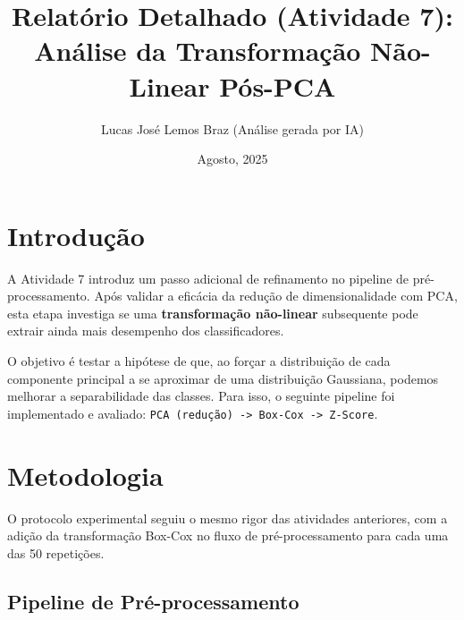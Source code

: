 \documentclass[a4paper,12pt]{article}
\title{Relatório Detalhado (Atividade 7): \\ Análise da Transformação Não-Linear Pós-PCA}
\author{Lucas José Lemos Braz (Análise gerada por IA)}
\date{Agosto, 2025}
\begin{document}
\maketitle

\section{Introdução}

A Atividade 7 introduz um passo adicional de refinamento no pipeline de pré-processamento. Após validar a eficácia da redução de dimensionalidade com PCA, esta etapa investiga se uma \textbf{transformação não-linear} subsequente pode extrair ainda mais desempenho dos classificadores. 

O objetivo é testar a hipótese de que, ao forçar a distribuição de cada componente principal a se aproximar de uma distribuição Gaussiana, podemos melhorar a separabilidade das classes. Para isso, o seguinte pipeline foi implementado e avaliado: \texttt{PCA (redução) -> Box-Cox -> Z-Score}.

\section{Metodologia}

O protocolo experimental seguiu o mesmo rigor das atividades anteriores, com a adição da transformação Box-Cox no fluxo de pré-processamento para cada uma das 50 repetições.

\subsection{Pipeline de Pré-processamento}
\end{document}
